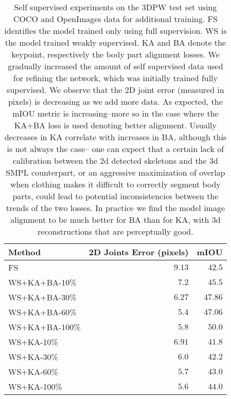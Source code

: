 \documentclass[runningheads]{llncs}
\begin{document}
\begin{table}[!htbp]
    \begin{tabular}[t]{|l|r|r|}
    \hline
    Method & 2D Joints Error (pixels) & mIOU \\
    \hline
    FS & $9.13$ & $42.5$ \\
    \hline    
    WS+KA+BA-10\% & $7.2$ & $45.5$ \\    
    \hline
    WS+KA+BA-30\% & $6.27$ & $47.86$ \\    
    \hline
    WS+KA+BA-60\% & $\mathbf{5.4}$ & $47.06$ \\    
    \hline
    WS+KA+BA-100\% & $5.8$ & $\mathbf{50.0}$ \\
    \hline
    WS+KA-10\% & $6.91$ & $41.8$ \\
    \hline
    WS+KA-30\% & $6.0$ & $42.2$ \\  
    \hline
    WS+KA-60\% & $5.7$ & $43.0$ \\
    \hline
    WS+KA-100\% & $5.6$ & $44.0$ \\
    \hline
    \end{tabular}
{
\caption{\small Self supervised experiments on the 3DPW test set using COCO and OpenImages data for additional training. FS identifies the model trained only using full supervision. WS is the model trained weakly supervised. KA and BA denote the keypoint, respectively the body part alignment losses. We gradually increased the amount of self supervised data used for refining the network, which was initially trained fully supervised. We observe that the 2D joint error (measured in pixels) is decreasing as we add more data. As expected, the mIOU metric is increasing--more so in the case where the KA+BA loss is used denoting better alignment. Usually decreases in KA correlate with increases in BA, although this is not always the case-- one can expect that a certain lack of calibration between the 2d detected skeletons and the 3d SMPL counterpart, or an aggressive maximization of overlap when clothing makes it difficult to correctly segment body parts, could lead to potential inconsistencies between the trends of the two losses. In practice we find the model image alignment to be much better for BA than for KA, with 3d reconstructions that are perceptually good. 
}
}
\label{tbl:ssupervised-experiments2}
\end{table}


\end{document}
